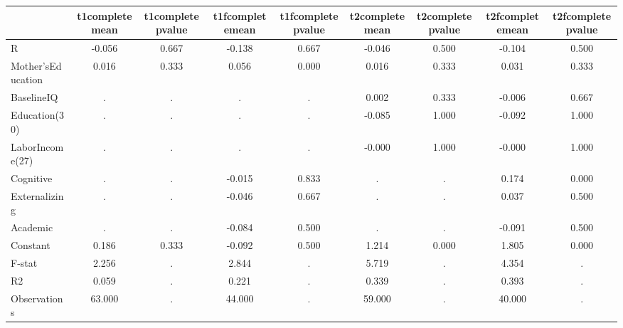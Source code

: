 \begin{table}[htbp]
\begin{tabular}{lcccccccc} \hline \hline
 & t1completemean  & t1completepvalue  & t1fcompletemean  & t1fcompletepvalue  & t2completemean  & t2completepvalue  & t2fcompletemean  & t2fcompletepvalue  \\  \hline 
R &    -0.056 &     0.667 &    -0.138 &     0.667 &    -0.046 &     0.500 &    -0.104 &     0.500 \\  
Mother'sEducation &     0.016 &     0.333 &     0.056 &     0.000 &     0.016 &     0.333 &     0.031 &     0.333 \\  
BaselineIQ &         . &         . &         . &         . &     0.002 &     0.333 &    -0.006 &     0.667 \\  
Education(30) &         . &         . &         . &         . &    -0.085 &     1.000 &    -0.092 &     1.000 \\  
LaborIncome(27) &         . &         . &         . &         . &    -0.000 &     1.000 &    -0.000 &     1.000 \\  
Cognitive &         . &         . &    -0.015 &     0.833 &         . &         . &     0.174 &     0.000 \\  
Externalizing &         . &         . &    -0.046 &     0.667 &         . &         . &     0.037 &     0.500 \\  
Academic &         . &         . &    -0.084 &     0.500 &         . &         . &    -0.091 &     0.500 \\  
Constant &     0.186 &     0.333 &    -0.092 &     0.500 &     1.214 &     0.000 &     1.805 &     0.000 \\  
F-stat &     2.256 &         . &     2.844 &         . &     5.719 &         . &     4.354 &         . \\  
R2 &     0.059 &         . &     0.221 &         . &     0.339 &         . &     0.393 &         . \\  
Observations &    63.000 &         . &    44.000 &         . &    59.000 &         . &    40.000 &         . \\  
\hline \hline \end{tabular}
\end{table}
